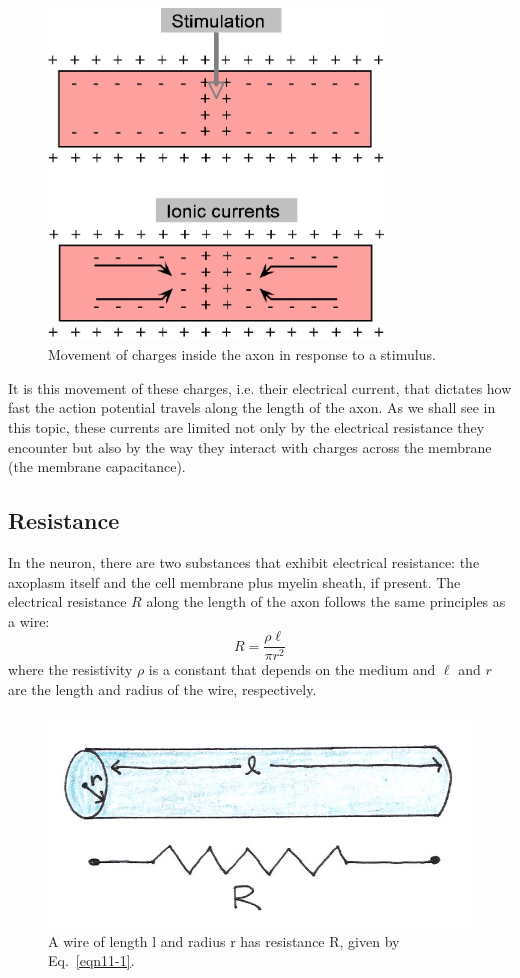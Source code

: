 \begin{figure}[!htb]
	\centering
	\includegraphics[width=3.5in]{./figures/Topic11/Fig11-7.jpg}
	\caption{Movement of charges inside the axon in response to a stimulus.}
	\label{Fig11-7}
\end{figure}
It is this movement of these charges, i.e. their electrical current, that dictates how fast the action potential travels along the length of the axon. As we shall see in this topic, these currents are limited not only by the electrical resistance they encounter but also by the way they interact with charges across the membrane (the membrane capacitance).

\subsection{Resistance}

In the neuron, there are two substances that exhibit electrical resistance: the axoplasm itself and the cell membrane plus myelin sheath, if present.  The electrical resistance $R$ along the length of the axon follows the same principles as a wire:
\begin{equation}\label{eqn11-1}
R=\frac{\rho\ell}{\pi r^2}
\end{equation}
where the resistivity $\rho$ is a constant that depends on the medium and $\ell$ and $r$ are the length and radius of the wire, respectively.  
\begin{figure}[!htb]
	\centering
	\includegraphics[width=4.5in]{./figures/Topic11/Fig11-8.jpg}
	\caption{A wire of length l and radius r has resistance R, given by Eq.~\ref{eqn11-1}.}
	\label{Fig11-8}
\end{figure}

